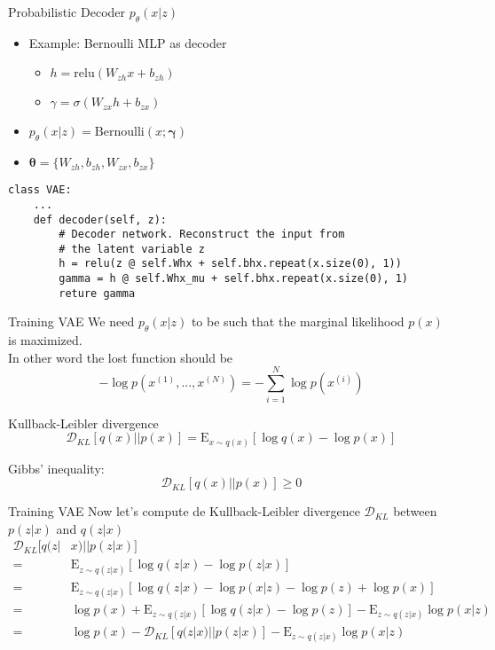 \documentclass{beamer}
\newcommand{\bernoulli}{\mathrm{Bernoulli}}
\newcommand{\relu}{\mathrm{relu}}
\newcommand{\kldiv}{\mathcal{D}_{KL}}
\newcommand{\E}{\mathrm{E}}
\begin{document}
\begin{frame}[fragile]{Probabilistic Decoder $p_\theta(x|z)$}
\begin{itemize}
	\item Example: Bernoulli MLP as decoder
	\begin{itemize}
		\item $h = \relu\left(W_{zh}x+b_{zh}\right)$
		\item $\gamma = \sigma\left(W_{zx}h+b_{zx}\right)$
	\end{itemize}
	\item $p_\theta(x|z)=\bernoulli(x;\bm{\gamma})$
	\item $\bm{\theta} = \{W_{zh}, b_{zh}, W_{zx}, b_{zx}\}$
\end{itemize}
\begin{verbatim}
class VAE:
    ...
    def decoder(self, z):
        # Decoder network. Reconstruct the input from 
        # the latent variable z
        h = relu(z @ self.Whx + self.bhx.repeat(x.size(0), 1))  
        gamma = h @ self.Whx_mu + self.bhx.repeat(x.size(0), 1)      
        reture gamma
\end{verbatim}
\end{frame}

\begin{frame}{Training VAE}
We need $p_\theta(x|z)$ to be such that the marginal likelihood $p(x)$ is maximized. \\

In other word the lost function should be
\[
	-\log p(x^{(1)},...,x^{(N)}) = -\sum_{i=1}^N \log p(x^{(i)})
\]
\end{frame}

\begin{frame}{Kullback-Leibler divergence}
\begin{equation}
\kldiv[q(x)||p(x)] 
= \E_{x\sim q(x)}[ \log q(x) - \log p(x)]
\end{equation}

\bigskip

Gibbs' inequality:
\begin{equation}
\kldiv[q(x)||p(x)] \geq 0
\end{equation}
\end{frame}

\begin{frame}{Training VAE}
Now let's compute de Kullback-Leibler divergence $\kldiv$ between $p(z|x)$ and $q(z|x)$
\begin{equation*}
\begin{split}
	\kldiv[q(z|&x)||p(z|x)]\\ 
	=& \E_{z\sim q(z|x)}[ \log q(z|x) - \log p(z|x)]\\
	=& \E_{z\sim q(z|x)}[ \log q(z|x) - \log p(x|z) - \log p(z) + \log p(x)]\\
	=& \log p(x) + \E_{z\sim q(z|x)}[ \log q(z|x)  - \log p(z)] - \E_{z\sim q(z|x)}\log p(x|z)\\
	=& \log p(x) - \kldiv[q(z|x)||p(z|x)] - \E_{z\sim q(z|x)}\log p(x|z)\\
\end{split}
\end{equation*}
\end{frame}
\end{document}
